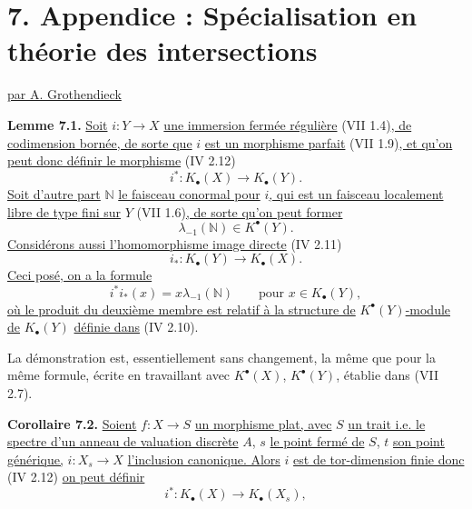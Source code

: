 
\section*{7. Appendice : Spécialisation en théorie des intersections}
\begin{center}
\underline{par A. Grothendieck}
\end{center}

\textbf{Lemme 7.1.} \uline{Soit} \(i:Y\to X\) \uline{une immersion fermée régulière} (VII 1.4)\uline{, de codimension bornée, de sorte que} \(i\) \uline{est un morphisme parfait} (VII 1.9)\uline{, et qu'on peut donc définir le morphisme} (IV 2.12)
\[
 i^*:K_\bullet(X)\longrightarrow K_\bullet(Y).
\]
\uline{Soit d'autre part} \(\mathbb N\) \uline{le faisceau conormal pour} \(i\)\uline{, qui est un faisceau localement libre de type fini sur} \(Y\) (VII 1.6)\uline{, de sorte qu'on peut former}
\[
 \lambda_{-1}(\mathbb N)\in K^{\bullet}(Y).
\]
\uline{Considérons aussi l'homomorphisme image directe} (IV 2.11)
\[
 i_*:K_\bullet(Y)\longrightarrow K_\bullet(X).
\]
\uline{Ceci posé, on a la formule}
\[
 i^*i_*(x)=x\lambda_{-1}(\mathbb N)\qquad\text{pour } x\in K_\bullet(Y),
\]
\uline{où le produit du deuxième membre est relatif à la structure de} \(K^{\bullet}(Y)\)\uline{-module de} \(K_\bullet(Y)\) \uline{définie dans} (IV 2.10).

La démonstration est, essentiellement sans changement, la même que pour la même formule, écrite en travaillant avec \(K^{\bullet}(X)\), \(K^{\bullet}(Y)\), établie dans (VII 2.7).

\textbf{Corollaire 7.2.} \uline{Soient} \(f:X\to S\) \uline{un morphisme plat, avec} \(S\) \uline{un trait i.e. le spectre d'un anneau de valuation discrète} \(A\), \(s\) \uline{le point fermé de} \(S\), \(t\) \uline{son point générique,} \(i:X_s\to X\) \uline{l'inclusion canonique. Alors} \(i\) \uline{est de tor-dimension finie donc} (IV 2.12) \uline{on peut définir}
\[
 i^*:K_\bullet(X)\longrightarrow K_\bullet(X_s),
\]
